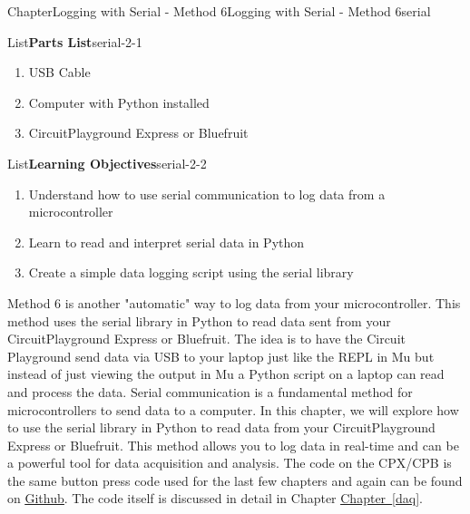 \documentclass[oneside,10pt,]{book}
\newcommand{\xreffont}{\relax}
\newcommand{\linkhilite}[1]{\underline{#1}}
\numberwithin{equation}{section}
\begin{document}
\begin{chapterptx}{Chapter}{Logging with Serial - Method 6}{}{Logging with Serial - Method 6}{}{}{serial}
\renewcommand*{\chaptername}{Chapter}
\begin{introduction}{}%
\begin{listptx}{List}{\textbf{Parts List}}{serial-2-1}{}%
%
\begin{enumerate}
\item{}USB Cable%
\item{}Computer with Python installed%
\item{}CircuitPlayground Express or Bluefruit%
\end{enumerate}
\end{listptx}%
\begin{listptx}{List}{\textbf{Learning Objectives}}{serial-2-2}{}%
%
\begin{enumerate}
\item{}Understand how to use serial communication to log data from a microcontroller%
\item{}Learn to read and interpret serial data in Python%
\item{}Create a simple data logging script using the serial library%
\end{enumerate}
\end{listptx}%
Method 6 is another "automatic" way to log data from your microcontroller. This method uses the serial library in Python to read data sent from your CircuitPlayground Express or Bluefruit. The idea is to have the Circuit Playground send data via USB to your laptop just like the REPL in Mu but instead of just viewing the output in Mu a Python script on a laptop can read and process the data. Serial communication is a fundamental method for microcontrollers to send data to a computer. In this chapter, we will explore how to use the serial library in Python to read data from your CircuitPlayground Express or Bluefruit. This method allows you to log data in real-time and can be a powerful tool for data acquisition and analysis. The code on the CPX\slash{}CPB is the same button press code used for the last few chapters and again can be found on \href{https://github.com/cmontalvo251/Microcontrollers/blob/master/Circuit_Playground/CircuitPython/Data_Logging/button_presses.py}{\linkhilite{Github}}. The code itself is discussed in detail in Chapter \hyperref[daq]{\linkhilite{Chapter~{\xreffont\ref{daq}}}}.%
\end{introduction}%
%
%
\typeout{************************************************}

\end{chapterptx}
\end{document}
